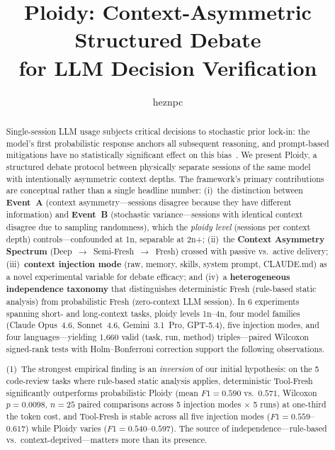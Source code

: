 \documentclass[11pt]{article}
\title{Ploidy: Context-Asymmetric Structured Debate\\for LLM Decision Verification}
\author{heznpc}
\date{}
\begin{document}
\maketitle

\begin{abstract}
Single-session LLM usage subjects critical decisions to stochastic prior lock-in: the model's first probabilistic response anchors all subsequent reasoning, and prompt-based mitigations have no statistically significant effect on this bias~\citep{feng2026anchoring}. We present Ploidy, a structured debate protocol between physically separate sessions of the same model with intentionally asymmetric context depths. The framework's primary contributions are conceptual rather than a single headline number: (i)~the distinction between \textbf{Event~A} (context asymmetry---sessions disagree because they have different information) and \textbf{Event~B} (stochastic variance---sessions with identical context disagree due to sampling randomness), which the \emph{ploidy level} (sessions per context depth) controls---confounded at 1n, separable at 2n+; (ii)~the \textbf{Context Asymmetry Spectrum} (Deep~$\to$~Semi-Fresh~$\to$~Fresh) crossed with passive vs.\ active delivery; (iii)~\textbf{context injection mode} (raw, memory, skills, system prompt, CLAUDE.md) as a novel experimental variable for debate efficacy; and (iv)~a \textbf{heterogeneous independence taxonomy} that distinguishes deterministic Fresh (rule-based static analysis) from probabilistic Fresh (zero-context LLM session). In 6 experiments spanning short- and long-context tasks, ploidy levels 1n--4n, four model families (Claude Opus~4.6, Sonnet~4.6, Gemini~3.1~Pro, GPT-5.4), five injection modes, and four languages---yielding 1{,}660 valid (task, run, method) triples---paired Wilcoxon signed-rank tests with Holm--Bonferroni correction support the following observations.

\noindent (1)~The strongest empirical finding is an \emph{inversion} of our initial hypothesis: on the 5 code-review tasks where rule-based static analysis applies, deterministic Tool-Fresh significantly outperforms probabilistic Ploidy (mean $F1 = 0.590$ vs.\ $0.571$, Wilcoxon $p = 0.0098$, $n = 25$ paired comparisons across 5 injection modes $\times$ 5 runs) at one-third the token cost, and Tool-Fresh is stable across all five injection modes ($F1 = 0.559$--$0.617$) while Ploidy varies ($F1 = 0.540$--$0.597$). The source of independence---rule-based vs.\ context-deprived---matters more than its presence.


\end{abstract}
\end{document}
